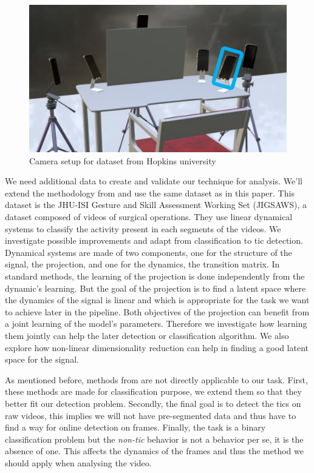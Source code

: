 \documentclass[twocolumn,10pt]{asme2ej}
\begin{document}
\begin{figure}[h]
    \centering
    \includegraphics[width=\columnwidth]{scrsht_camera_setup.png}
    \caption{Camera setup for dataset from Hopkins university}
    \label{fig:Hopkins-camera-setup}
\end{figure}


We need additional data to create and validate our technique for analysis. We'll extend the methodology from \cite{zappella} and use the same dataset as in this paper. This dataset is the JHU-ISI Gesture and Skill Assessment Working Set (JIGSAWS), a dataset composed of videos of surgical operations. They use linear dynamical systems to classify the activity present in each segments of the videos. We investigate possible improvements and adapt from classification to tic detection. Dynamical systems are made of two components, one for the structure of the signal, the projection, and one for the dynamics, the transition matrix. In standard methods, the learning of the projection is done independently from the dynamic's learning. But the goal of the projection is to find a latent space where the dynamics of the signal is linear and which is appropriate for the task we want to achieve later in the pipeline. Both objectives of the projection can benefit from a joint learning of the model's parameters. Therefore we investigate how learning them jointly can help the later detection or classification algorithm. We also explore how non-linear dimensionality reduction can help in finding a good latent space for the signal.

As mentioned before, methods from \cite{zappella} are not directly applicable to our task. First, these methods are made for classification purpose, we extend them so that they better fit our detection problem. Secondly, the final goal is to detect the tics on raw videos, this implies we will not have pre-segmented data and thus have to find a way for online detection on frames. Finally, the task is a binary classification problem but the \textit{non-tic} behavior is not a behavior per se, it is the absence of one. This affects the dynamics of the frames and thus the method we should apply when analysing the video.
\end{document}
